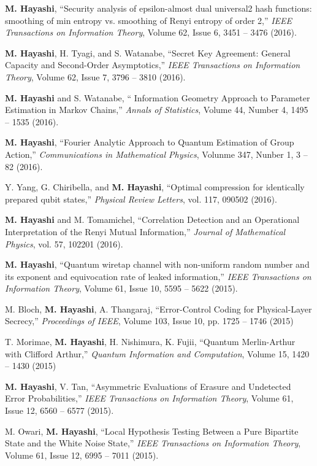 \documentclass[a4paper,12pt,oneside]{article}
\begin{document}
\begin{enumerate}
\textbf{M. Hayashi}, ``Security analysis of epsilon-almost dual universal2 hash functions: smoothing of min entropy vs. smoothing of Renyi entropy of order 2,'' 
{\em IEEE Transactions on Information Theory}, Volume 62, Issue 6, 3451 -- 3476 (2016). 

\textbf{M. Hayashi}, H. Tyagi, and S. Watanabe, ``Secret Key Agreement: General Capacity and Second-Order Asymptotics,'' 
{\em IEEE Transactions on Information Theory}, Volume 62, Issue 7, 3796 -- 3810 (2016). 

\textbf{M. Hayashi} and S. Watanabe, `` Information Geometry Approach to Parameter Estimation in Markov Chains,'' 
{\em Annals of Statistics}, Volume 44, Number 4, 1495 -- 1535 (2016). 

\textbf{M. Hayashi}, 
``Fourier Analytic Approach to Quantum Estimation of Group Action,'' 
{\em Communications in Mathematical Physics}, Volunme 347, Nunber 1, 3 -- 82 (2016). 

Y. Yang, G. Chiribella, and \textbf{M. Hayashi}, 
``Optimal compression for identically prepared qubit states,'' 
{\em Physical Review Letters}, vol. 117, 090502 (2016).

\textbf{M. Hayashi} and M. Tomamichel, 
``Correlation Detection and an Operational Interpretation of the Renyi Mutual Information,'' 
{\em Journal of Mathematical Physics}, vol. 57, 102201 (2016).

\textbf{M. Hayashi}, ``Quantum wiretap channel with non-uniform random number and its exponent and equivocation rate of leaked information,'' 
{\em IEEE Transactions on Information Theory}, Volume 61, Issue 10, 5595 -- 5622 (2015). 

M. Bloch, \textbf{M. Hayashi}, A. Thangaraj, ``Error-Control Coding for Physical-Layer Secrecy,'' 
{\em Proceedings of IEEE}, Volume 103, Issue 10, pp. 1725 -- 1746 (2015) 

T. Morimae, \textbf{M. Hayashi}, H. Nishimura, K. Fujii, ``Quantum Merlin-Arthur with Clifford Arthur,'' 
{\em Quantum Information and Computation}, 
Volume 15, 1420 -- 1430 (2015)

\textbf{M. Hayashi}, V. Tan, ``Asymmetric Evaluations of Erasure and Undetected Error Probabilities,'' 
{\em IEEE Transactions on Information Theory}, Volume 61, Issue 12, 6560 -- 6577 (2015). 

M. Owari, \textbf{M. Hayashi}, ``Local Hypothesis Testing Between a Pure Bipartite State and the White Noise State,'' 
{\em IEEE Transactions on Information Theory}, 
Volume 61, Issue 12, 6995 -- 7011 (2015).


\end{enumerate}
\end{document}
